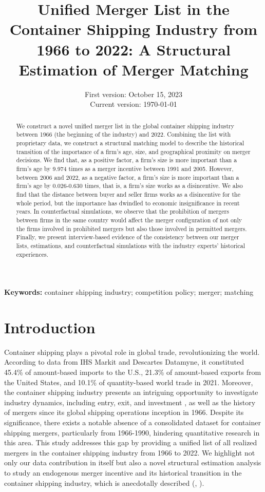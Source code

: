 \documentclass[10pt]{article}
\title{Unified Merger List in the Container Shipping Industry from 1966 to 2022: A Structural Estimation of Merger Matching}
\date{
First version: October 15, 2023\\
Current version: \today
}
\begin{document}
\maketitle

\begin{abstract}
We construct a novel unified merger list in the global container shipping industry between 1966 (the beginning of the industry) and 2022. Combining the list with proprietary data, we construct a structural matching model to describe the historical transition of the importance of a firm's age, size, and geographical proximity on merger decisions. 
We find that, as a positive factor, a firm's size is more important than a firm's age by 9.974 times as a merger incentive between 1991 and 2005.
However, between 2006 and 2022, as a negative factor, a firm's size is more important than a firm's age by 0.026-0.630 times, that is, a firm's size works as a disincentive.
We also find that the distance between buyer and seller firms works as a disincentive for the whole period, but the importance has dwindled to economic insignificance in recent years. 
In counterfactual simulations, we observe that the prohibition of mergers between firms in the same country would affect the merger configuration of not only the firms involved in prohibited mergers but also those involved in permitted mergers.
Finally, we present interview-based evidence of the consistency between our merger lists, estimations, and counterfactual simulations with the industry experts' historical experiences.

\end{abstract} 

\vspace{0.1in}
\noindent\textbf{Keywords:} container shipping industry; competition policy; merger; matching 
\vspace{0in}


\section{Introduction}

Container shipping plays a pivotal role in global trade, revolutionizing the world. According to data from IHS Markit and Descartes Datamyne, it constituted 45.4\% of amount-based imports to the U.S., 21.3\% of amount-based exports from the United States, and 10.1\% of quantity-based world trade in 2021.
Moreover, the container shipping industry presents an intriguing opportunity to investigate industry dynamics, including entry, exit, and investment \citep{otani2023industry}, as well as the history of mergers since its global shipping operations inception in 1966.
Despite its significance, there exists a notable absence of a consolidated dataset for container shipping mergers, particularly from 1966-1990, hindering quantitative research in this area. 
This study addresses this gap by providing a unified list of all realized mergers in the container shipping industry from 1966 to 2022.
We highlight not only our data contribution in itself but also a novel structural estimation analysis to study an endogenous merger incentive and its historical transition in the container shipping industry, which is anecdotally described (\cite{broeze2002globalisation}, \cite{levinson2016box}).
\end{document}

